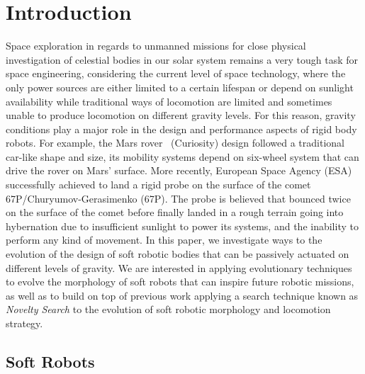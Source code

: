 \documentclass{sig-alternate}
\begin{document}



\section{Introduction}
Space exploration in regards to unmanned missions for close physical investigation of celestial bodies in our solar system remains a very tough task for space engineering, considering the current level of space technology, where the only power sources are either limited to a certain lifespan or depend on sunlight availability while traditional ways of locomotion are limited and sometimes unable to produce locomotion on different gravity levels. For this reason, gravity conditions play a major role in the design and performance aspects of rigid body robots. For example, the Mars rover~\cite{grotzinger2012mars} (Curiosity) design followed a traditional car-like shape and size, its mobility systems depend on six-wheel system that can drive the rover on Mars' surface. More recently, European Space Agency (ESA) successfully achieved to land a rigid probe on the surface of the comet 67P/Churyumov-Gerasimenko (67P). The probe is believed that bounced twice on the surface of the comet before finally landed in a rough terrain going into hybernation due to insufficient sunlight to power its systems, and the inability to perform any kind of movement. In this paper, we investigate ways to the evolution of the design of soft robotic bodies that can be passively actuated on different levels of gravity. We are interested in applying evolutionary techniques to evolve the morphology of soft robots that can inspire future robotic missions, as well as to build on top of previous work applying a search technique known as \emph{Novelty Search} to the evolution of soft robotic morphology and locomotion strategy.

\subsection{Soft Robots}
\end{document}

